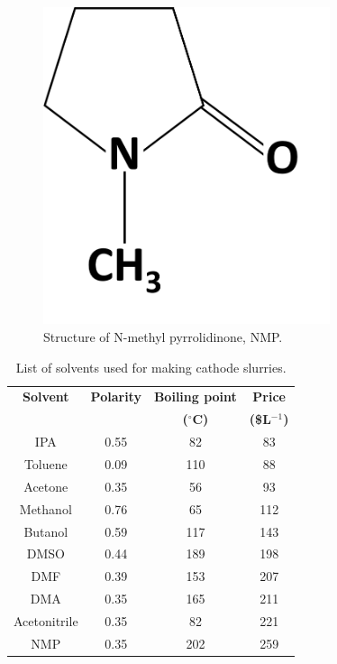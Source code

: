 \begin{figure}[tbh!]
\centering
\includegraphics[width=0.75\textwidth]{Figures/chap7fig/NMP}
\caption{Structure of N-methyl pyrrolidinone, NMP.}
\label{Figures/chap7fig:NMP}
\end{figure}

\begin{table}
\caption{List of solvents used for making cathode slurries.} \label{tab1}
\begin{center}
 \begin{tabular}{|c|c|c|c|} 
 \hline
 \textbf{Solvent} & \textbf{Polarity} & \textbf{Boiling point} & \textbf{Price}\\
 \textbf{} & \textbf{} & \textbf{($^{\circ}$C)} & \textbf{(\$L$^{-1}$)}\\
 \hline
 \hline
IPA & 0.55 & 82 & 83 \\
Toluene & 0.09 & 110 & 88 \\
Acetone & 0.35 & 56 & 93 \\
Methanol & 0.76 & 65 & 112 \\ 
Butanol & 0.59 & 117 & 143 \\
DMSO & 0.44 & 189 & 198 \\
DMF & 0.39 & 153 & 207 \\
DMA & 0.35 & 165 & 211 \\
Acetonitrile & 0.35 & 82 & 221 \\
NMP & 0.35 & 202 & 259 \\
 \hline
\end{tabular}
\end{center}
\end{table}

